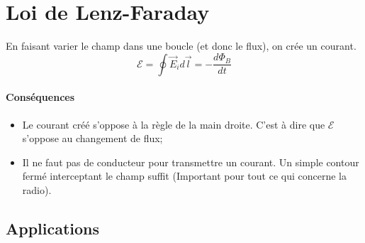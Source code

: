 \documentclass[11pt,a4paper]{article}
\newcommand{\EMF}{\mathcal{E}}
\begin{document}
\section{Loi de Lenz-Faraday}
\label{sec:faraday}
En faisant varier le champ dans une boucle (et donc le flux), on crée un courant.
\[ \EMF = \oint \vec E_i d\vec l = -\frac{d\Phi_B}{dt} \] %
\paragraph{Conséquences}
\begin{itemize}
	\item Le courant créé s'oppose à la règle de la main droite.
		C'est à dire que $\EMF$ s'oppose au changement de flux;
	\item Il ne faut pas de conducteur pour transmettre un courant.
		Un simple contour fermé interceptant le champ suffit
		(Important pour tout ce qui concerne la radio).
\end{itemize}

\subsection{Applications}
\end{document}
